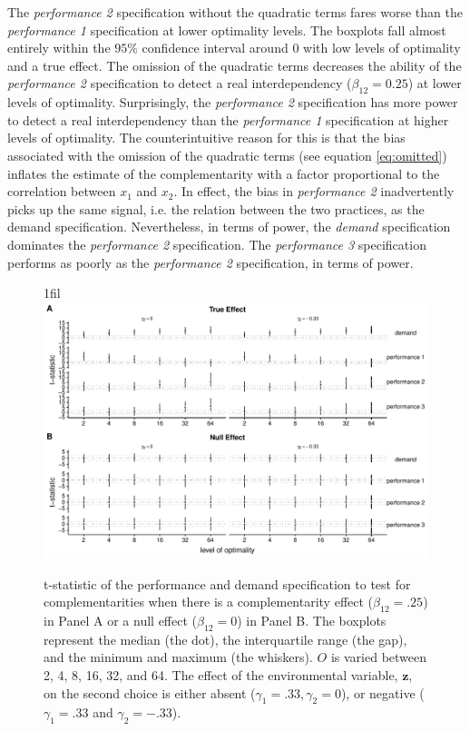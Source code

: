 \documentclass[12pt]{article}
\makeatletter
\newcommand*{\centerfloat}{%
  \parindent \z@
  \leftskip \z@ \@plus 1fil \@minus \textwidth
  \rightskip\leftskip
  \parfillskip \z@skip}
\makeatother
\begin{document}
The \emph{performance 2} specification without the quadratic terms fares worse than the \emph{performance 1} specification at lower optimality levels. The boxplots fall almost entirely within the $95\%$ confidence interval around $0$ with low levels of optimality and a true effect. The omission of the quadratic terms decreases the ability of the \emph{performance 2} specification to detect a real interdependency ($\beta_{12} = 0.25$) at lower levels of optimality. Surprisingly, the \emph{performance 2} specification has more power to detect a real interdependency than the \emph{performance 1} specification at higher levels of optimality. The counterintuitive reason for this is that the bias associated with the omission of the quadratic terms (see equation \ref{eq:omitted}) inflates the estimate of the complementarity with a factor proportional to the correlation between $x_1$ and $x_2$. In effect, the bias in \emph{performance 2} inadvertently picks up the same signal, i.e. the relation between the two practices, as the demand specification. Nevertheless, in terms of power, the \emph{demand} specification dominates the \emph{performance 2} specification. The \emph{performance 3} specification performs as poorly as the \emph{performance 2}  specification, in terms of power. 

\begin{figure}
\centerfloat
\includegraphics[width=450px]{figure-latex/main_new_plot.pdf}
\caption[Error Rate  and Power of Demand and Performance Specification]
{\label{main} t-statistic of the performance and demand specification to test
for complementarities when there is a complementarity effect ($\beta_{12} = .25$)
in Panel A or a null effect ($\beta_{12} = 0$) in Panel B. The boxplots represent the median (the dot), the interquartile range (the gap), and the minimum and maximum (the whiskers). $O$ is varied between 2, 4, 8, 16, 32, and 64. The effect of the environmental variable, $\mathbf{z}$, on the second choice is either absent ($\gamma_1 = .33,   \gamma_2 = 0$), or negative ($\gamma_1 = .33$ and $\gamma_2 = -.33$).}
\end{figure}
\end{document}
